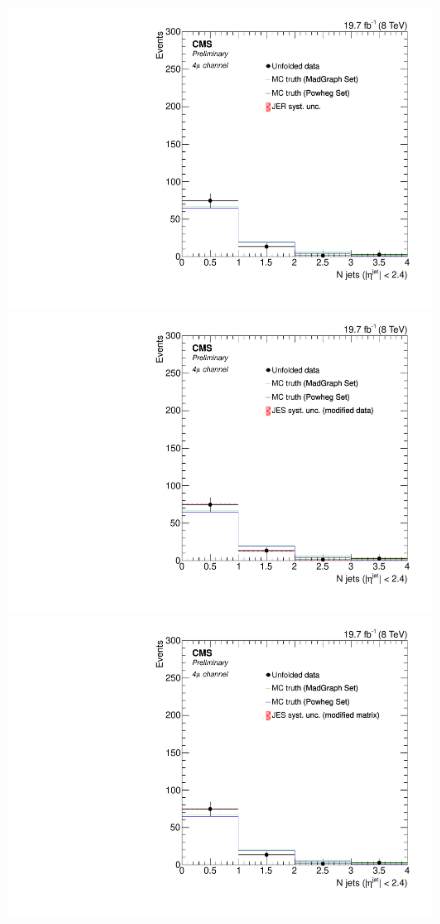\begin{figure}[hbtp]
\begin{center}
    \includegraphics[width=0.8\cmsFigWidth]{Figures/Unfolding/Systematics/ZZTo4m_CentralJets_JER_Mad_fr}
    \includegraphics[width=0.8\cmsFigWidth]{Figures/Unfolding/Systematics/ZZTo4m_CentralJets_JES_ModData_Mad_fr}     
    \includegraphics[width=0.8\cmsFigWidth]{Figures/Unfolding/Systematics/ZZTo4m_CentralJets_JES_ModMat_Mad_fr}

\end{center}
\end{figure}
